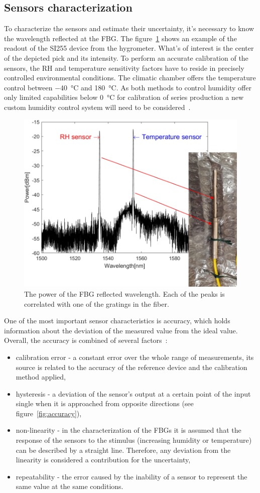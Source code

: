 \subsection{Sensors characterization}
To characterize the sensors and estimate their uncertainty, it's necessary to know the wavelength reflected at the \gls{FBG}. The figure~\ref{fig_hygrometer1} shows an example of the readout of the SI255 device from the hygrometer. What's of interest is the center of the depicted pick and its intensity. To perform an accurate calibration of the sensors, the \gls{RH} and temperature sensitivity factors have to reside in precisely controlled environmental conditions. The climatic chamber offers the temperature control between \SI{-40}{\celsius} and \SI{180}{\celsius}. As both methods to control humidity offer only limited capabilities below \SI{0}{\celsius} for calibration of series production a new custom humidity control system will need to be considered~\cite{Berruti, Veldscholte:2021wjt}. 
\begin{figure}[!h]
\centering
\includegraphics[width=0.6\columnwidth]{Chapter5/images/hygr.png}
\caption{The power of the FBG reflected wavelength. Each of the peaks is correlated with one of the gratings in the fiber.}
\label{fig_hygrometer1}
\end{figure}
One of the most important sensor characteristics is accuracy, which holds information about the deviation of the measured value from the ideal value. Overall, the accuracy is combined of several factors~\cite{sensors_physics}:
\begin{itemize}
    \item calibration error - a constant error over the whole range of measurements, its source is related to the accuracy of the reference device and the calibration method applied,
    \item hysteresis - a deviation of the sensor's output at a certain point of the input single when it is approached from opposite directions (see figure~\ref{fig:accuracy}), 
    \item non-linearity - in the characterization of the \glspl{FBG} it is assumed that the response of the sensors to the stimulus (increasing humidity or temperature) can be described by a straight line. Therefore, any deviation from the linearity is considered a contribution for the uncertainty,
    \item repeatability - the error caused by the inability of a sensor to represent the same value at the same conditions. 
\end{itemize}
